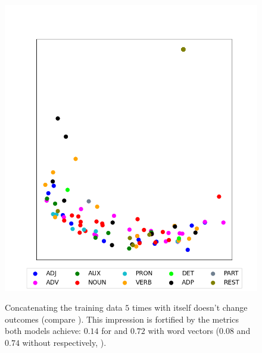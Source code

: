 \begin{figure}[H]
{		\includegraphics[width=\twocolpicwidth]{Bilder/chapter4/additional_configurations/W2V_W2V_5000E_100BS_1L_5C_200P_1500T_D/MDS_of_Transition_Probability_Matrix;_t=1,_DF=0.5.png}
	}
	\caption{Concatenating the training data $ 5 $ times with itself doesn't change outcomes (compare \figref{\ref{fig: text model cumulativ mds plots}}). This impression is fortified by the metrics both models achieve: $ 0.14 $ for  and $ 0.72 $ with word vectors ($ 0.08 $ and $ 0.74 $ without respectively, \tabref{\ref{tab: text model versions and metrics}}).}
\end{figure}


\clearpage
